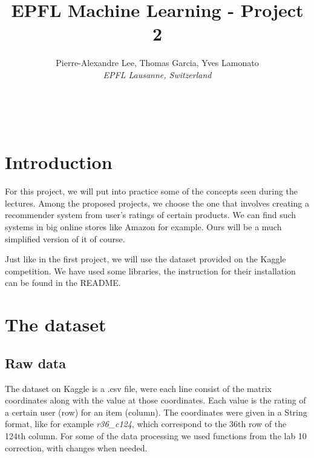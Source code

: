 \documentclass[a4paper]{article}
\begin{document}
\title{EPFL Machine Learning - Project 2}
\author{
  Pierre-Alexandre Lee, Thomas Garcia, Yves Lamonato\\
  \textit{EPFL Lausanne, Switzerland}
}
\date{\vspace{-5ex}}

\maketitle
\mbox{}\\




\section{Introduction}
For this project, we will put into practice some of the concepts seen during the lectures. 
Among the proposed projects, we choose the one that involves creating a recommender system from user's ratings of certain products. 
We can find such systems in big online stores like Amazon for example. Ours will be a much simplified version of it of course.  

Just like in the first project, we will use the dataset provided on the Kaggle competition. We have used some libraries, the instruction for their installation can be found in the README.






\section{The dataset}
\subsection{Raw data}
The dataset on Kaggle is a .csv file, were each line consist of the matrix coordinates along with the value at those coordinates. Each value is the rating of a certain user (row) for an item (column). The coordinates were given in a String format, like for example \textit{r36\_c124}, which correspond to the 36th row of the 124th column. 
For some of the data processing we used functions from the lab 10 correction, with changes when needed.
\end{document}
